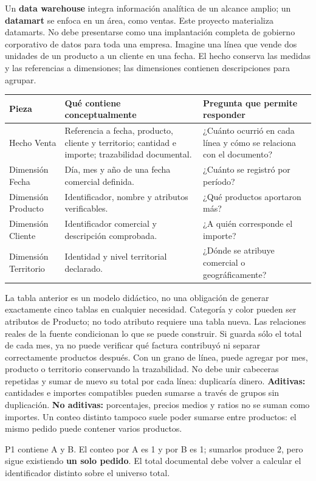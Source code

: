 Un \textbf{data warehouse} integra información analítica de un alcance amplio; un \textbf{datamart} se enfoca en un área, como ventas. Este proyecto materializa datamarts. No debe presentarse como una implantación completa de gobierno corporativo de datos para toda una empresa.
Imagine una línea que vende dos unidades de un producto a un cliente en una fecha. El hecho conserva las medidas y las referencias a dimensiones; las dimensiones contienen descripciones para agrupar.
\begin{tabularx}{\linewidth}{@{}p{33mm}YY@{}}
\toprule
\textbf{Pieza}&\textbf{Qué contiene conceptualmente}&\textbf{Pregunta que permite responder}\\
\midrule
Hecho Venta&Referencia a fecha, producto, cliente y territorio; cantidad e importe; trazabilidad documental.&¿Cuánto ocurrió en cada línea y cómo se relaciona con el documento?\\
Dimensión Fecha&Día, mes y año de una fecha comercial definida.&¿Cuánto se registró por período?\\
Dimensión Producto&Identificador, nombre y atributos verificables.&¿Qué productos aportaron más?\\
Dimensión Cliente&Identificador comercial y descripción comprobada.&¿A quién corresponde el importe?\\
Dimensión Territorio&Identidad y nivel territorial declarado.&¿Dónde se atribuye comercial o geográficamente?\\
\bottomrule
\end{tabularx}
La tabla anterior es un modelo didáctico, no una obligación de generar exactamente cinco tablas en cualquier necesidad. Categoría y color pueden ser atributos de Producto; no todo atributo requiere una tabla nueva. Las relaciones reales de la fuente condicionan lo que se puede construir.
Si guarda sólo el total de cada mes, ya no puede verificar qué factura contribuyó ni separar correctamente productos después. Con un grano de línea, puede agregar por mes, producto o territorio conservando la trazabilidad. No debe unir cabeceras repetidas y sumar de nuevo su total por cada línea: duplicaría dinero.
\textbf{Aditivas:} cantidades e importes compatibles pueden sumarse a través de grupos sin duplicación. \textbf{No aditivas:} porcentajes, precios medios y ratios no se suman como importes. Un conteo distinto tampoco suele poder sumarse entre productos: el mismo pedido puede contener varios productos.
\begin{good}
P1 contiene A y B. El conteo por A es 1 y por B es 1; sumarlos produce 2, pero sigue existiendo \textbf{un solo pedido}. El total documental debe volver a calcular el identificador distinto sobre el universo total.
\end{good}

